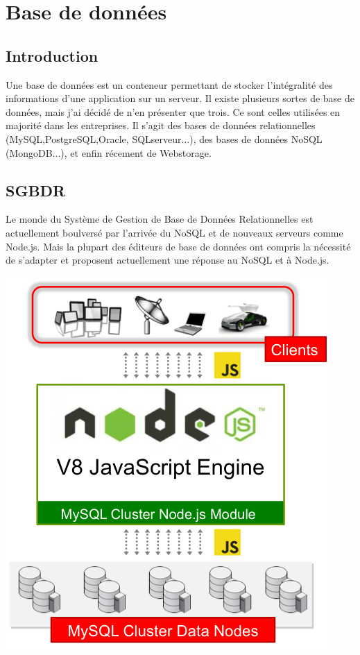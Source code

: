 \chapter{Base de données}

\section{Introduction}
Une base de données est un conteneur permettant de stocker l'intégralité des informations d'une application sur un serveur.
Il existe plusieurs sortes de base de données, mais j'ai décidé de n'en présenter que trois. Ce sont celles utilisées en majorité dans les entreprises.
Il s'agit des bases de données relationnelles (MySQL,PostgreSQL,Oracle, SQLserveur...), des bases de données NoSQL (MongoDB...), et enfin récement de Webstorage.


\section{SGBDR}
Le monde du Système de Gestion de Base de Données Relationnelles est actuellement boulversé par l'arrivée du NoSQL et de nouveaux serveurs comme Node.js.
Mais la plupart des éditeurs de base de données ont compris la nécessité de s'adapter et proposent actuellement une réponse au NoSQL et à Node.js.


\begin{center}
\includegraphics[scale=0.6]{img/mysql_cluster_73_nodejs_figure1.png} 
\label{Graphique technologie mysql cluster}
\end{center}

